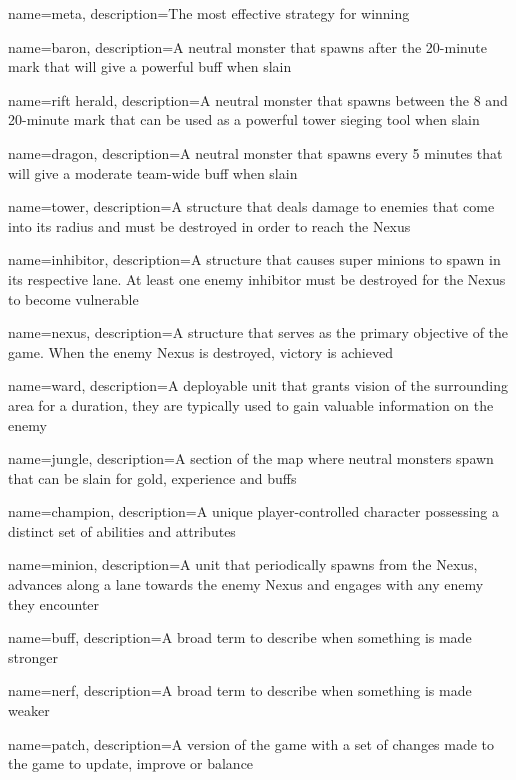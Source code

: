 
{
    name=meta,
    description={The most effective strategy for winning}
}

{
    name=baron,
    description={A neutral monster that spawns after the 20-minute mark that will give a powerful buff when slain}
}

{
    name=rift herald,
    description={A neutral monster that spawns between the 8 and 20-minute mark that can be used as a powerful tower sieging tool when slain}
}

{
    name=dragon,
    description={A neutral monster that spawns every 5 minutes that will give a moderate team-wide buff when slain}
}

{
    name=tower,
    description={A structure that deals damage to enemies that come into its radius and must be destroyed in order to reach the Nexus}
}

{
    name=inhibitor,
    description={A structure that causes super minions to spawn in its respective lane. At least one enemy inhibitor must be destroyed for the Nexus to become vulnerable}
}

{
    name=nexus,
    description={A structure that serves as the primary objective of the game.
    When the enemy Nexus is destroyed, victory is achieved}
}

{
    name=ward,
    description={A deployable unit that grants vision of the surrounding area for a duration, they are typically used to gain valuable information on the enemy}
}

{
    name=jungle,
    description={A section of the map where neutral monsters spawn that can be slain for gold, experience and buffs}
}

{
    name=champion,
    description={A unique player-controlled character possessing a distinct set of abilities and attributes}
}

{
    name=minion,
    description={A unit that periodically spawns from the Nexus, advances along a lane towards the enemy Nexus and engages with any enemy they encounter}
}

{
    name=buff,
    description={A broad term to describe when something is made stronger}
}

{
    name=nerf,
    description={A broad term to describe when something is made weaker}
}

{
    name=patch,
    description={A version of the game with a set of changes made to the game to update, improve or balance}
}